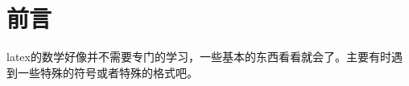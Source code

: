 \documentclass[12pt,oneside]{book}
\begin{document}
\frontmatter


\author{万泽}
\titleLB

\chapter*{前言}
\begin{common-format}
latex的数学好像并不需要专门的学习，一些基本的东西看看就会了。主要有时遇到一些特殊的符号或者特殊的格式吧。


\end{common-format}


\setcounter{tocdepth}{2}
\tableofcontents
\end{document}
